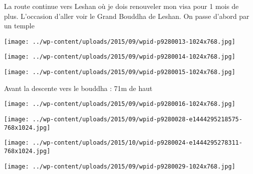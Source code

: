  La route continue vers Leshan où je dois renouveler mon visa pour 1 mois de plus. L'occasion d'aller voir le Grand Bouddha de Leshan. \newline
 On passe d'abord par un temple \newline
 \newline
\centerline{\texttt{[image: ../wp-content/uploads/2015/09/wpid-p9280013-1024x768.jpg]} } 
 \newline
 \newline
\centerline{\texttt{[image: ../wp-content/uploads/2015/09/wpid-p9280014-1024x768.jpg]} } 
 \newline
 \newline
\centerline{\texttt{[image: ../wp-content/uploads/2015/09/wpid-p9280015-1024x768.jpg]} } 
 \newline
 Avant la descente vers le bouddha : 71m de haut \newline
 \newline
\centerline{\texttt{[image: ../wp-content/uploads/2015/09/wpid-p9280016-1024x768.jpg]} } 
 \newline
 \newline
\centerline{\texttt{[image: ../wp-content/uploads/2015/09/wpid-p9280028-e1444295218575-768x1024.jpg]} } 
 \newline
 \newline
\centerline{\texttt{[image: ../wp-content/uploads/2015/10/wpid-p9280024-e1444295278311-768x1024.jpg]} } 
 \newline
 \newline
\centerline{\texttt{[image: ../wp-content/uploads/2015/09/wpid-p9280029-1024x768.jpg]} } 
 \newline

\newpage
 
